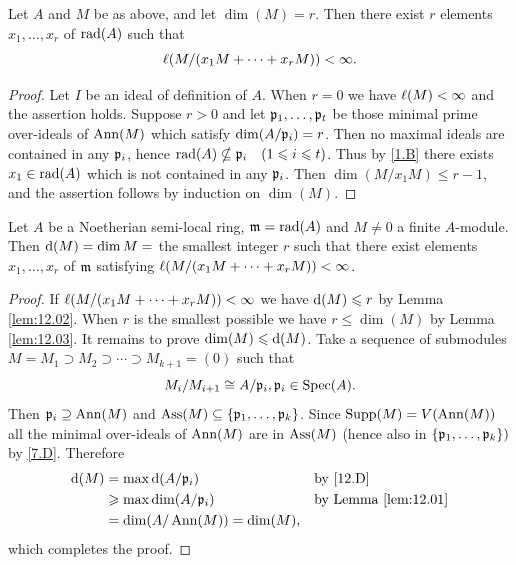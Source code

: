 \documentclass[../main]{subfiles}
\begin{document}
\begin{parlemma}\label{lem:12.03}
Let $A$ and $M$ be as above, and let $\dim(M)=r$. Then there exist $r$ elements $x_1, \ldots, x_r$ of $\operatorname{rad}(A)$ such that \[\ell(M / (x_1 M+\cdots+x_r M))<\infty.\]
\end{parlemma}

\begin{proof}
Let $I$ be an ideal of definition of $A$. When $r=0$ we have $\ell(M)<\infty$ and the assertion holds. Suppose $r>0$ and let $\mathfrak{p}_1, \dots, \mathfrak{p}_t$ be those minimal prime over-ideals of $\operatorname{Ann}(M)$ which satisfy $\operatorname{dim}(A / \mathfrak{p}_i)=r$. Then no maximal ideals are contained in any $\mathfrak{p}_i$, hence $\rad(A) \nsubseteq \ideal{p}_i\for{1 \leqslant i \leqslant t}$. Thus by \ref{1.B} there exists $x_1 \in \operatorname{rad}(A)$ which is not contained in any $\mathfrak{p}_i$. Then $\dim(M / x_1 M) \leqslant r-1$, and the assertion follows by induction on $\dim(M)$.
\end{proof}

\begin{partheorem}\label{thm:017}
Let $A$ be a Noetherian semi-local ring, $\mathfrak{m}=\operatorname{rad}(A)$ and $M \neq 0$ a finite $A$-module. Then $\mathrm{d}(M)=\operatorname{dim} M=$ the smallest integer $r$ such that there exist elements $x_1,\ldots, x_r$ of $\mathfrak{m}$ satisfying $\ell(M / (x_1 M+\cdots+x_r M))<\infty$.
\end{partheorem}

\begin{proof}
If $\ell(M / (x_1 M+\cdots+x_r M))<\infty$ we have $\mathrm{d}(M)\leqslant r$ by Lemma \ref{lem:12.02}. When $r$ is the smallest possible we have $r \leqslant \dim(M)$ by Lemma \ref{lem:12.03}. It remains to prove $\operatorname{dim}(M) \leqslant \mathrm{d}(M)$. Take a sequence of submodules $M=M_1\supset M_2 \supset \cdots \supset M_{k+1}=(0)$ such that \[M_i / M_{i+1} \cong A / \mathfrak{p}_i, \mathfrak{p}_i \in \operatorname{Spec}(A).\] Then $\mathfrak{p}_i \supseteq\operatorname{Ann}(M)$ and $\operatorname{Ass}(M)\subseteq\{\mathfrak{p}_1, \dots, \mathfrak{p}_k\}$. Since $\operatorname{Supp}(M) = V(\operatorname{Ann}(M))$ all the minimal over-ideals of $\operatorname{Ann}(M)$ are in $\operatorname{Ass}(M)$ (hence also in $\{\mathfrak{p}_1, \dots, \mathfrak{p}_k\})$ by \ref{7.D}. Therefore
\begin{align*}
    \mathrm{d}(M)&=\max\mathrm{d}(A/\mathfrak{p}_i) & &\text{by \ref{12.D}}\\
    &\geqslant\max\operatorname{dim}(A/\mathfrak{p}_i) & &\text{by Lemma \ref{lem:12.01}}\\
    &=\operatorname{dim}(A/\operatorname{Ann}(M))=\operatorname{dim}(M), & &
\end{align*}
which completes the proof.
\end{proof} 
\end{document}
